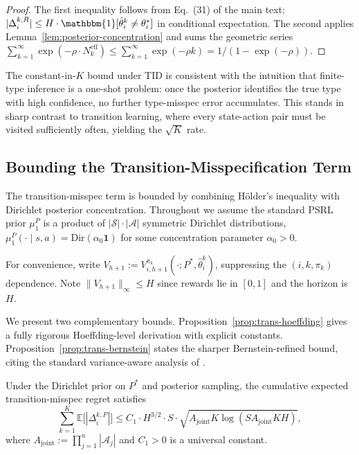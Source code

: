 \begin{proof}
The first inequality follows from Eq.~(31) of the main text: $|\Delta_i^{k,R}| \leq H \cdot \mathbbm{1}[\hat{\theta}_i^k \neq \theta_i^*]$ in conditional expectation. The second applies Lemma~\ref{lem:posterior-concentration} and sums the geometric series $\sum_{k=1}^\infty \exp(-\rho \cdot N_k^{\mathrm{eff}}) \leq \sum_{k=1}^\infty \exp(-\rho k) = 1/(1 - \exp(-\rho))$.
\end{proof}

\begin{remark}[Interpretation]
The constant-in-$K$ bound under TID is consistent with the intuition that finite-type inference is a one-shot problem: once the posterior identifies the true type with high confidence, no further type-misspec error accumulates. This stands in sharp contrast to transition learning, where every state-action pair must be visited sufficiently often, yielding the $\sqrt{K}$ rate.
\end{remark}

\subsection{Bounding the Transition-Misspecification Term}

The transition-misspec term is bounded by combining Hölder's inequality with Dirichlet posterior concentration. Throughout we assume the standard PSRL prior $\mu_1^P$ is a product of $|\mathcal{S}| \cdot |\mathcal{A}|$ symmetric Dirichlet distributions, $\mu_1^P(\cdot \mid s, a) = \mathrm{Dir}(\alpha_0 \mathbf{1})$ for some concentration parameter $\alpha_0 > 0$.

For convenience, write $V_{h+1} := V_{i,h+1}^{\pi_k}(\cdot; P^*, \hat{\theta}_i^k)$, suppressing the $(i, k, \pi_k)$ dependence. Note $\|V_{h+1}\|_\infty \leq H$ since rewards lie in $[0, 1]$ and the horizon is $H$.

We present two complementary bounds. Proposition~\ref{prop:trans-hoeffding} gives a fully rigorous Hoeffding-level derivation with explicit constants. Proposition~\ref{prop:trans-bernstein} states the sharper Bernstein-refined bound, citing the standard variance-aware analysis of \citet{lu2019information,azar2017minimax}.

\begin{proposition}
\label{prop:trans-hoeffding}
Under the Dirichlet prior on $P^*$ and posterior sampling, the cumulative expected transition-misspec regret satisfies
\begin{equation}
\label{eq:trans-hoeffding}
\sum_{k=1}^K \mathbb{E}\big[|\Delta_i^{k,P}|\big] \leq C_1 \cdot H^{3/2} \cdot S \cdot \sqrt{A_{\mathrm{joint}} K \log(SA_{\mathrm{joint}}KH)},
\end{equation}
where $A_{\mathrm{joint}} := \prod_{j=1}^n |\mathcal{A}_j|$ and $C_1 > 0$ is a universal constant.
\end{proposition}

